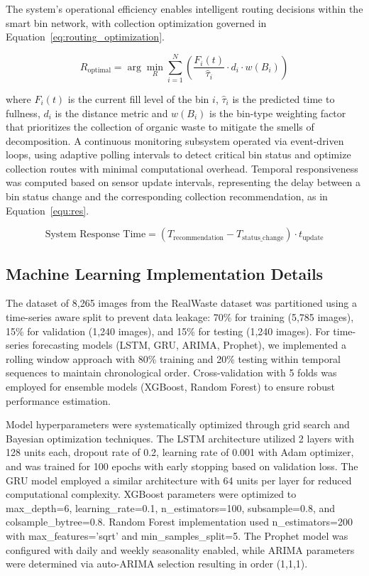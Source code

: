 \documentclass[final,5p,times,twocolumn]{elsarticle}
\begin{document}
The system's operational efficiency enables intelligent routing decisions within the smart bin network, with collection optimization governed in Equation~\ref{eq:routing_optimization}.

\begin{equation}
R_{\text{optimal}} = \arg\min_{R} \sum_{i=1}^{N} \left( \frac{F_i(t)}{\hat{\tau}_i} \cdot d_i \cdot w(B_i) \right)
\label{eq:routing_optimization}
\end{equation}

\noindent where $F_i(t)$ is the current fill level of the bin $i$, $\hat{\tau}_i$ is the predicted time to fullness, $d_i$ is the distance metric and $w(B_i)$ is the bin-type weighting factor that prioritizes the collection of organic waste to mitigate the smells of decomposition. A continuous monitoring subsystem operated via event-driven loops, using adaptive polling intervals to detect critical bin status and optimize collection routes with minimal computational overhead. Temporal responsiveness was computed based on sensor update intervals, representing the delay between a bin status change and the corresponding collection recommendation, as in Equation~\ref{equ:res}.

\begin{equation}
\text{System Response Time} = (T_\text{recommendation} - T_\text{status\_change}) \cdot t_\text{update}\label{equ:res}
\end{equation}


\subsection{Machine Learning Implementation Details}
The dataset of 8,265 images from the RealWaste dataset was partitioned using a time-series aware split to prevent data leakage: 70\% for training (5,785 images), 15\% for validation (1,240 images), and 15\% for testing (1,240 images). For time-series forecasting models (LSTM, GRU, ARIMA, Prophet), we implemented a rolling window approach with 80\% training and 20\% testing within temporal sequences to maintain chronological order. Cross-validation with 5 folds was employed for ensemble models (XGBoost, Random Forest) to ensure robust performance estimation.

Model hyperparameters were systematically optimized through grid search and Bayesian optimization techniques. The LSTM architecture utilized 2 layers with 128 units each, dropout rate of 0.2, learning rate of 0.001 with Adam optimizer, and was trained for 100 epochs with early stopping based on validation loss. The GRU model employed a similar architecture with 64 units per layer for reduced computational complexity. XGBoost parameters were optimized to max\_depth=6, learning\_rate=0.1, n\_estimators=100, subsample=0.8, and colsample\_bytree=0.8. Random Forest implementation used n\_estimators=200 with max\_features='sqrt' and min\_samples\_split=5. The Prophet model was configured with daily and weekly seasonality enabled, while ARIMA parameters were determined via auto-ARIMA selection resulting in order (1,1,1). 
\end{document}
